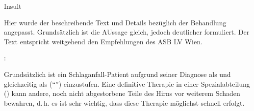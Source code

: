 \documentclass[
ngerman,
paper=a4,
asymmetric,
fontsize=10pt,
headings=small,
draft=false,
openany,
numbers=noenddot,
bibtotocnumbered,
footnotes=multiple,
toc=flat,
]{scrreprt}
\begin{document}
\Text
{Insult}
{Hier wurde der beschreibende Text und Details bezüglich der
Behandlung angepasst. Grundsätzlich ist die AUssage gleich,
jedoch deutlicher formuliert. Der Text entspricht weitgehend
den Empfehlungen des ASB LV Wien.

\bigskip

: 

Grundsätzlich
ist ein Schlaganfall-Patient aufgrund seiner Diagnose als  und gleichzeitig als 
(\enquote{}) einzustufen. 
Eine definitive Therapie in einer Spezialabteilung
() kann andere, noch nicht abgestorbene
Teile des Hirns vor weiterem Schaden bewahren, d.\,h. es ist
sehr wichtig, dass diese Therapie möglichst schnell
erfolgt.
% 


}
\end{document}
